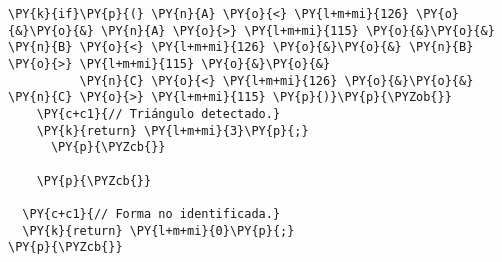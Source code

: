\begin{Verbatim}[commandchars=\\\{\}]
      \PY{k}{if}\PY{p}{(} \PY{n}{A} \PY{o}{<} \PY{l+m+mi}{126} \PY{o}{&}\PY{o}{&} \PY{n}{A} \PY{o}{>} \PY{l+m+mi}{115} \PY{o}{&}\PY{o}{&} \PY{n}{B} \PY{o}{<} \PY{l+m+mi}{126} \PY{o}{&}\PY{o}{&} \PY{n}{B} \PY{o}{>} \PY{l+m+mi}{115} \PY{o}{&}\PY{o}{&}
          \PY{n}{C} \PY{o}{<} \PY{l+m+mi}{126} \PY{o}{&}\PY{o}{&} \PY{n}{C} \PY{o}{>} \PY{l+m+mi}{115} \PY{p}{)}\PY{p}{\PYZob{}} 
	\PY{c+c1}{// Triángulo detectado.}
	\PY{k}{return} \PY{l+m+mi}{3}\PY{p}{;}
      \PY{p}{\PYZcb{}}
	  
    \PY{p}{\PYZcb{}}

  \PY{c+c1}{// Forma no identificada.}
  \PY{k}{return} \PY{l+m+mi}{0}\PY{p}{;}
\PY{p}{\PYZcb{}}
\end{Verbatim}

